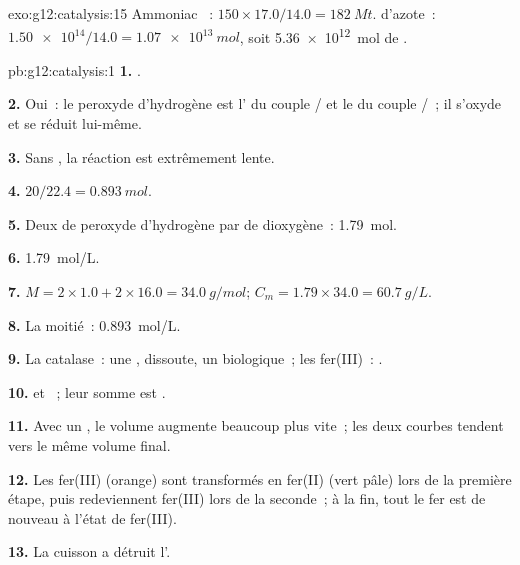 \begin{solution}{exo:g12:catalysis:15}
Ammoniac ~: $150 \times 17.0 / 14.0 = \qty{182}{Mt}$. 
d'azote~: $\num{1.50e14} / 14.0 = \qty{1.07e13}{mol}$, soit
\qty{5.36e12}{mol} de .
\end{solution}

\begin{solution}{pb:g12:catalysis:1}
\textbf{1.} .

\textbf{2.} Oui~: le peroxyde d'hydrogène est l' du couple
/ et le  du couple /~; il
s'oxyde et se réduit lui-même.

\textbf{3.} Sans , la réaction est extrêmement lente.

\textbf{4.} $20 / 22.4 = \qty{0.893}{mol}$.

\textbf{5.} Deux  de peroxyde d'hydrogène par  de dioxygène~:
\qty{1.79}{mol}.

\textbf{6.} \qty{1.79}{mol/L}.

\textbf{7.} $M = 2 \times 1.0 + 2 \times 16.0 = \qty{34.0}{g/mol}$;
$C_m = 1.79 \times 34.0 = \qty{60.7}{g/L}$.

\textbf{8.} La moitié~: \qty{0.893}{mol/L}.

\textbf{9.} La catalase~: une , dissoute, un 
biologique~; les  fer(III)~: .

\textbf{10.}  et
~; leur somme est
.

\textbf{11.} Avec un , le volume augmente beaucoup plus vite~;
les deux courbes tendent vers le même volume final.

\textbf{12.} Les  fer(III) (orange) sont transformés en  fer(II)
(vert pâle) lors de la première étape, puis redeviennent fer(III) lors
de la seconde~; à la fin, tout le fer est de nouveau à l'état de
fer(III).

\textbf{13.} La cuisson a détruit l'.


\end{solution}

